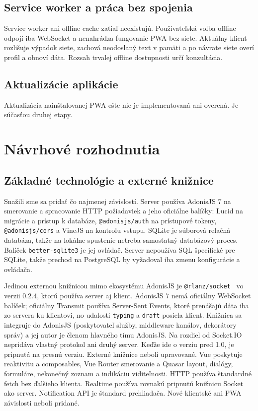 \documentclass[11pt,a4paper]{article}
\begin{document}
\subsection{Service worker a práca bez spojenia}
Service worker ani offline cache zatiaľ neexistujú. Používateľská
voľba offline odpojí iba WebSocket a nenahrádza fungovanie PWA bez siete.
Aktuálny klient rozlišuje výpadok siete, zachová neodoslaný text v pamäti
a po návrate siete overí profil a obnoví dáta. Rozsah trvalej offline
dostupnosti určí konzultácia.

\subsection{Aktualizácie aplikácie}
Aktualizácia nainštalovanej PWA ešte nie je implementovaná ani overená.
Je súčasťou druhej etapy.

\section{Návrhové rozhodnutia}
\subsection{Základné technológie a externé knižnice}
Snažili sme sa pridať čo najmenej závislostí. Server používa AdonisJS 7
na smerovanie a spracovanie HTTP požiadaviek a jeho oficiálne balíčky:
Lucid na migrácie a prístup k databáze, \texttt{@adonisjs/auth} na
prístupové tokeny, \texttt{@adonisjs/cors} a VineJS na kontrolu vstupu.
SQLite je súborová relačná databáza, takže na lokálne spustenie netreba
samostatný databázový proces. Balíček \texttt{better-sqlite3} je jej
ovládač. Server nepoužíva SQL špecifické pre SQLite, takže prechod na
PostgreSQL by vyžadoval iba zmenu konfigurácie a ovládača.

Jedinou externou knižnicou mimo ekosystému AdonisJS je
\texttt{@rlanz/socket}~\cite{rlanz-socket} vo verzii 0.2.4, ktorú používa
server aj klient. AdonisJS 7 nemá oficiálny WebSocket balíček; oficiálny
Transmit používa Server-Sent Events, ktoré prenášajú dáta iba zo servera
ku klientovi, no udalosti \texttt{typing} a \texttt{draft} posiela klient.
Knižnica sa integruje do AdonisJS (poskytovateľ služby, middleware kanálov,
dekorátory správ) a jej autor je členom hlavného tímu AdonisJS. Na rozdiel
od Socket.IO nepridáva vlastný protokol ani druhý server. Keďže ide o verziu
pred 1.0, je pripnutá na presnú verziu. Externé knižnice neboli upravované.
Vue poskytuje reaktivitu a composables, Vue Router smerovanie a Quasar
layout, dialógy, formuláre, nekonečný zoznam a indikáciu viditeľnosti.
HTTP používa štandardné fetch bez ďalšieho klienta. Realtime používa
rovnakú pripnutú knižnicu Socket ako server. Notification API je
štandard prehliadača. Nové klientské ani PWA závislosti neboli pridané.
\end{document}
